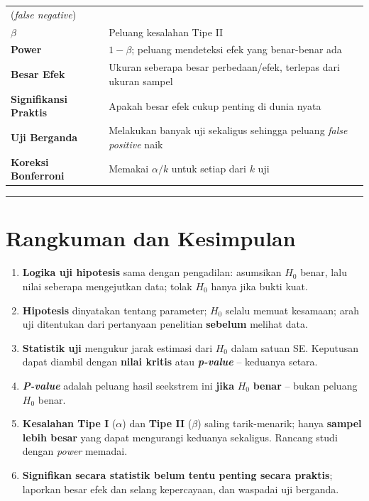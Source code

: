 \documentclass[
  indonesian,
  letterpaper,
]{book}
\providecommand{\tightlist}{%
  \setlength{\itemsep}{0pt}\setlength{\parskip}{0pt}}
\begin{document}
{\begin{longtable}[]{@{}
  >{\raggedright\arraybackslash}p{}
  >{\raggedright\arraybackslash}p{}@{}}
(\emph{false negative}) \\
\(\beta\) & Peluang kesalahan Tipe II \\
\textbf{Power} & \(1 - \beta\); peluang mendeteksi efek yang benar-benar
ada \\
\textbf{Besar Efek} & Ukuran seberapa besar perbedaan/efek, terlepas
dari ukuran sampel \\
\textbf{Signifikansi Praktis} & Apakah besar efek cukup penting di dunia
nyata \\
\textbf{Uji Berganda} & Melakukan banyak uji sekaligus sehingga peluang
\emph{false positive} naik \\
\textbf{Koreksi Bonferroni} & Memakai \(\alpha/k\) untuk setiap dari
\(k\) uji \\
\end{longtable}
}

\begin{center}\rule{0.5\linewidth}{0.5pt}\end{center}


\chapter{Rangkuman dan Kesimpulan}\label{rangkuman-dan-kesimpulan-1}

\begin{enumerate}
\def\labelenumi{\arabic{enumi}.}
\tightlist
\item
  \textbf{Logika uji hipotesis} sama dengan pengadilan: asumsikan
  \(H_0\) benar, lalu nilai seberapa mengejutkan data; tolak \(H_0\)
  hanya jika bukti kuat.
\item
  \textbf{Hipotesis} dinyatakan tentang parameter; \(H_0\) selalu memuat
  kesamaan; arah uji ditentukan dari pertanyaan penelitian
  \textbf{sebelum} melihat data.
\item
  \textbf{Statistik uji} mengukur jarak estimasi dari \(H_0\) dalam
  satuan SE. Keputusan dapat diambil dengan \textbf{nilai kritis} atau
  \textbf{\emph{p-value}} -- keduanya setara.
\item
  \textbf{\emph{P-value}} adalah peluang hasil seekstrem ini
  \textbf{jika} \(H_0\) \textbf{benar} -- bukan peluang \(H_0\) benar.
\item
  \textbf{Kesalahan Tipe I} (\(\alpha\)) dan \textbf{Tipe II}
  (\(\beta\)) saling tarik-menarik; hanya \textbf{sampel lebih besar}
  yang dapat mengurangi keduanya sekaligus. Rancang studi dengan
  \emph{power} memadai.
\item
  \textbf{Signifikan secara statistik belum tentu penting secara
  praktis}; laporkan besar efek dan selang kepercayaan, dan waspadai uji
  berganda.
\end{enumerate}
\end{document}
